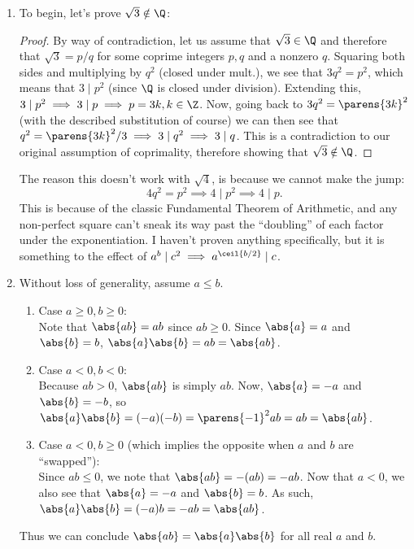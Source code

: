 \documentclass{article}
\begin{document}
\begin{enumerate}
  \item To begin, let's prove $\sqrt{3} \notin \Q$:
        \begin{proof}
          By way of contradiction, let us assume that $\sqrt{3} \in \Q$ and therefore that $\sqrt{3} = p/q$ for some coprime integers
          $p, q$ and a nonzero $q$. Squaring both sides and multiplying by $q^{2}$ (closed under mult.),
          we see that $3q^{2} = p^{2}$, which means that $3 \mid p^{2}$ (since $\Q$ is closed under division).
          Extending this, $3 \mid p^{2} \implies 3 \mid p \implies p = 3k, k \in \Z$. Now, going back to $3q^{2} = \parens{3k}^{2}$
          (with the described substitution of course) we can then see that $q^{2} = \parens{3k}^{2}/3 \implies 3 \mid q^{2} \implies 3 \mid q$.
          This is a contradiction to our original assumption of coprimality, therefore showing that $\sqrt{3} \notin \Q$.
        \end{proof}

        The reason this doesn't work with $\sqrt{4}$, is because we cannot
        make the jump:
        \begin{equation*}
          4q^{2} = p^{2} \implies 4 \mid p^{2} \implies 4 \mid p.
        \end{equation*}
        This is because of the classic Fundamental Theorem of Arithmetic, and any non-perfect square can't sneak its way past
        the ``doubling'' of each factor under the exponentiation.
        I haven't proven anything specifically, but it is something to the effect of $a^{b} \mid c^{2} \implies a^{\ceil{b/2}} \mid c$.

  \item Without loss of generality, assume $a \le b$.
        \begin{enumerate}
            \item Case $a \ge 0, b \ge 0$:\\
                Note that $\abs{ab} = ab$ since $ab \ge 0$. Since $\abs{a} = a$ and $\abs{b} = b$, $\abs{a}\abs{b} = ab = \abs{ab}$.
          \item Case $a < 0, b < 0$:\\
                Because $ab > 0$, $\abs{ab}$ is simply $ab$.
                Now, $\abs{a} = -a$ and $\abs{b} = -b$, so $\abs{a}\abs{b} = (-a)(-b) = \parens{-1}^{2}ab = ab = \abs{ab}$.
          \item Case $a < 0, b \ge 0$ (which implies the opposite when $a$ and $b$ are ``swapped''):\\
                Since $ab \le 0$, we note that $\abs{ab} = -(ab) = -ab$.
                Now that $a < 0$, we also see that $\abs{a} = -a$ and $\abs{b} = b$. As such, $\abs{a}\abs{b} = (-a)b = -ab = \abs{ab}$.
        \end{enumerate}
        Thus we can conclude $\abs{ab} = \abs{a}\abs{b}$ for all real $a$ and $b$.


\end{enumerate}
\end{document}
